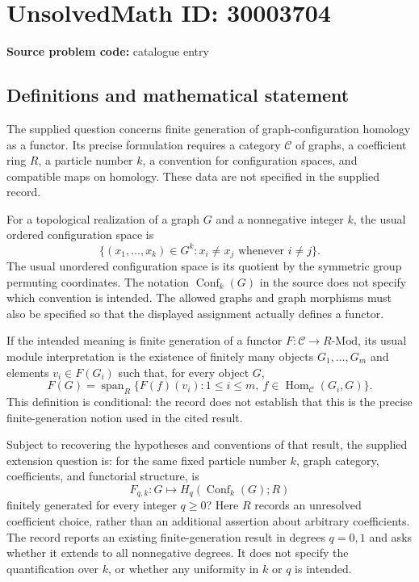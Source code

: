\documentclass[11pt]{article}
\begin{document}
\section*{UnsolvedMath ID: 30003704}
\textbf{Source problem code:} catalogue entry
\subsection{Definitions and mathematical statement}
The supplied question concerns finite generation of graph-configuration homology as a functor. Its precise formulation requires a category \(\mathcal C\) of graphs, a coefficient ring \(R\), a particle number \(k\), a convention for configuration spaces, and compatible maps on homology. These data are not specified in the supplied record.

For a topological realization of a graph \(G\) and a nonnegative integer \(k\), the usual ordered configuration space is
\[
\{(x_1,\ldots,x_k)\in G^k : x_i\ne x_j\text{ whenever }i\ne j\}.
\]
The usual unordered configuration space is its quotient by the symmetric group permuting coordinates. The notation \(\operatorname{Conf}_k(G)\) in the source does not specify which convention is intended. The allowed graphs and graph morphisms must also be specified so that the displayed assignment actually defines a functor.

If the intended meaning is finite generation of a functor \(F:\mathcal C\to R\text{-}\mathrm{Mod}\), its usual module interpretation is the existence of finitely many objects \(G_1,\ldots,G_m\) and elements \(v_i\in F(G_i)\) such that, for every object \(G\),
\[
F(G)=\operatorname{span}_R\{F(f)(v_i):1\le i\le m,\ f\in\operatorname{Hom}_{\mathcal C}(G_i,G)\}.
\]
This definition is conditional: the record does not establish that this is the precise finite-generation notion used in the cited result.

Subject to recovering the hypotheses and conventions of that result, the supplied extension question is: for the same fixed particle number \(k\), graph category, coefficients, and functorial structure, is
\[
F_{q,k}:G\longmapsto H_q(\operatorname{Conf}_k(G);R)
\]
finitely generated for every integer \(q\ge0\)? Here \(R\) records an unresolved coefficient choice, rather than an additional assertion about arbitrary coefficients. The record reports an existing finite-generation result in degrees \(q=0,1\) and asks whether it extends to all nonnegative degrees. It does not specify the quantification over \(k\), or whether any uniformity in \(k\) or \(q\) is intended.
\end{document}
